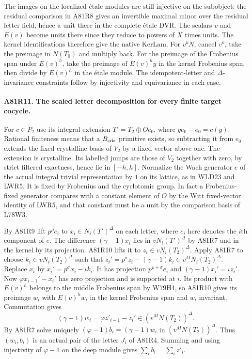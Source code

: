 The images on the localized \'etale modules are still injective
on the subobject: the residual comparison in A81R8 gives an
invertible maximal minor over the residual letter field, hence a
unit there in the complete \'etale DVR. The scalars $v$ and $E(v)$
become units there since they reduce to powers of $X$ times units.
The kernel identifications therefore give the native $\mathrm{KerLam}$.
For $v^kN$, cancel $v^k$, take the preimage in $N(T_0)$ and
multiply back. For the preimage of the Frobenius span under
$E(v)^h$, take the preimage of $E(v)^h y$ in the kernel Frobenius
span, then divide by $E(v)^h$ in the \'etale module. The
idempotent-letter and $\Delta$-invariance constraints follow by
injectivity and equivariance in each case.

\paragraph{A81R11. The scaled letter decomposition for every finite target cocycle.}
For $c\in P_2$ use its integral extension
$T'=T_2\oplus O e_0$, where $g e_0-e_0=c(g)$.
Rational finiteness means that a $B_{\rm cris}$ primitive exists,
so subtracting it from $e_0$ extends the fixed crystalline basis
of $V_2$ by a fixed vector above one. The extension is crystalline.
Its labelled jumps are those of $V_2$ together with zero, by strict
filtered exactness, hence lie in $[-h,h]$. Normalize the Wach
generator $e$ of the actual integral trivial representation by
$1$ on its lattice, as in WLD23 and LWR5. It is fixed by Frobenius
and the cyclotomic group. In fact a Frobenius-fixed generator
compares with a constant element of $O$ by the Witt fixed-vector
identity of LWR5, and that constant must be a unit by the comparison
basis of L78W3.

By A81R9 lift $p^\rho e_i$ to $x_i\in N_i(T')^\Delta$ on each
letter, where $e_i$ here denotes the $i$th component of $e$.
The difference $(\gamma-1)x_i$ lies in $vN_i(T')^\Delta$ by A81R7
and in the kernel by its projection. A81R10 lifts it to
$z_i\in vN_i(T_2)^\Delta$. Apply A81R7 to choose
$k_i\in vN_i(T_2)^\Delta$ such that
$z_i'=p^\sigma z_i-(\gamma-1)k_i\in v^MN_i(T_2)^\Delta$.
Replace $x_i$ by $x_i'=p^\sigma x_i-\iota k_i$. It has projection
$p^{\rho+\sigma}e_i$ and $(\gamma-1)x_i'=\iota z_i'$.
Now $\varphi x_{i-1}'-x_i'$ has zero projection and is supported
at $i$. Its product with $E(v)^h$ belongs to the middle Frobenius
span by W79H4, so A81R10 gives its preimage $w_i$ with
$E(v)^hw_i$ in the kernel Frobenius span and $w_i$ invariant.
Commutation gives
\[
        (\gamma-1)w_i=\varphi z'_{i-1}-z_i'\in(v^MN(T_2))^\Delta .
\]
By A81R7 solve uniquely
$(\varphi-1)b_i=(\gamma-1)w_i$ in $(v^MN(T_2))^\Delta$.
Thus $(w_i,b_i)$ is an actual pair of the letter $J_i$ of A81R4.
Summing and using injectivity of $\varphi-1$ on the deep module
gives $\sum_i b_i=\sum_i z'_i$.

